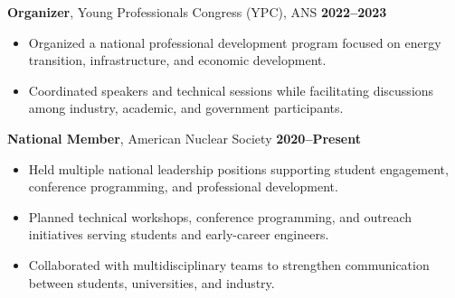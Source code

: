 \documentclass[margin,line]{resume}
\begin{document}
\begin{resume}
    \textbf{Organizer}, Young Professionals Congress (YPC), ANS \hfill \textbf{2022--2023}\vspace{.5mm}\\%
    \begin{itemize}
        \item Organized a national professional development program focused on energy transition, infrastructure, and economic development.
        \item Coordinated speakers and technical sessions while facilitating discussions among industry, academic, and government participants.
    \end{itemize}

    \textbf{National Member}, American Nuclear Society \hfill \textbf{2020--Present}\vspace{.5mm}\\%
    \begin{itemize}
        \item Held multiple national leadership positions supporting student engagement, conference programming, and professional development.
        \item Planned technical workshops, conference programming, and outreach initiatives serving students and early-career engineers.
        \item Collaborated with multidisciplinary teams to strengthen communication between students, universities, and industry.
    \end{itemize}


\end{resume}
\end{document}
